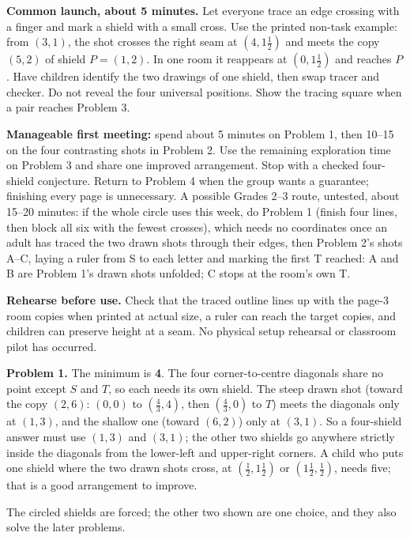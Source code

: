 \documentclass[11pt,letterpaper]{article}
\newcommand{\sectiontitle}[1]{\par\vspace{4pt}{\large\bfseries #1}\par}
\newcommand{\answer}[1]{\par\vspace{3pt}\textbf{Problem #1.} }
\begin{document}
\textbf{Common launch, about 5 minutes.} Let everyone trace an edge crossing with a finger and mark a shield with a small cross. Use the printed non-task example: from $(3,1)$, the shot crosses the right seam at $(4,1\frac12)$ and meets the copy $(5,2)$ of shield $P=(1,2)$. In one room it reappears at $(0,1\frac12)$ and reaches $P$. Have children identify the two drawings of one shield, then swap tracer and checker. Do not reveal the four universal positions. Show the tracing square when a pair reaches Problem 3.

\textbf{Manageable first meeting:} spend about 5 minutes on Problem 1, then 10--15 on the four contrasting shots in Problem 2. Use the remaining exploration time on Problem 3 and share one improved arrangement. Stop with a checked four-shield conjecture. Return to Problem 4 when the group wants a guarantee; finishing every page is unnecessary. A possible Grades 2--3 route, untested, about 15--20 minutes: if the whole circle uses this week, do Problem 1 (finish four lines, then block all six with the fewest crosses), which needs no coordinates once an adult has traced the two drawn shots through their edges, then Problem 2's shots A--C, laying a ruler from S to each letter and marking the first T reached: A and B are Problem 1's drawn shots unfolded; C stops at the room's own T.

\textbf{Rehearse before use.} Check that the traced outline lines up with the page-3 room copies when printed at actual size, a ruler can reach the target copies, and children can preserve height at a seam. No physical setup rehearsal or classroom pilot has occurred.
\newpage
\sectiontitle{Answers and optional hints}
\answer{1} The minimum is \textbf{4}. The four corner-to-centre diagonals share no point except $S$ and $T$, so each needs its own shield. The steep drawn shot (toward the copy $(2,6)$: $(0,0)$ to $(\frac43,4)$, then $(\frac43,0)$ to $T$) meets the diagonals only at $(1,3)$, and the shallow one (toward $(6,2)$) only at $(3,1)$. So a four-shield answer must use $(1,3)$ and $(3,1)$; the other two shields go anywhere strictly inside the diagonals from the lower-left and upper-right corners. A child who puts one shield where the two drawn shots cross, at $(\frac12,1\frac12)$ or $(1\frac12,\frac12)$, needs five; that is a good arrangement to improve.

\begin{center}
\end{center}
The circled shields are forced; the other two shown are one choice, and they also solve the later problems.
\end{document}
